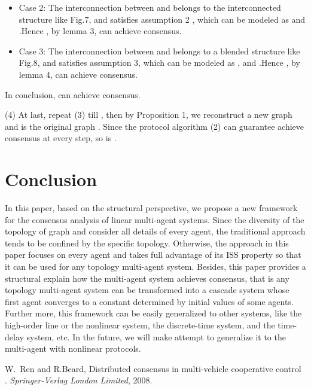 \documentclass[english]{cccconf}
\begin{document}
{{\begin{itemize}
  \item Case 2:  The interconnection between   and   belongs to the
interconnected structure like Fig.7, and satisfies assumption 2 , which can be modeled as   and  .Hence , by lemma 3,  can achieve consensus.
\end{itemize}

\begin{itemize}
  \item Case 3:  The interconnection between     and    belongs to
a blended structure like Fig.8, and satisfies assumption 3, which can be modeled as   ,  and  .Hence , by lemma 4,   can achieve consensus.
\end{itemize}

 In conclusion,    can achieve consensus.

(4)	At last, repeat  (3)  till  , then by Proposition 1,
we reconstruct a new graph   and   is the original graph  . Since  the protocol algorithm (2) can guarantee   achieve consensus at every step, so is   .


\section{Conclusion}

In this paper, based on the structural perspective, we propose a new framework for the consensus analysis of linear multi-agent systems.  Since the diversity of the topology of graph and consider all details of every agent,
the traditional approach tends to be confined by the specific topology. Otherwise, the approach in this paper focuses on every agent and takes full advantage of its ISS property so that it can be used for any topology multi-agent system. Besides, this paper provides a structural explain  how the multi-agent system achieves consensus, that is any topology multi-agent system can be transformed into a cascade system whose  first agent converges to a constant determined by initial values of some agents. Further more, this framework can be easily generalized to other  systems, like the high-order line or the nonlinear system, the discrete-time system, and the time-delay system, etc. In the future, we will make attempt to generalize it to the multi-agent with nonlinear protocols.

\begin{thebibliography}{0}

W.~Ren and R.Beard, Distributed consensus in multi-vehicle cooperative control . \emph{Springer-Verlag London Limited}, 2008.


\end{thebibliography}}}
\end{document}
